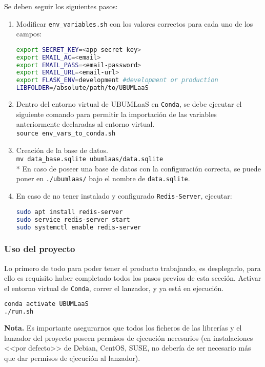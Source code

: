 Se deben seguir los siguientes pasos:
\begin{enumerate}
\item Modificar \texttt{env\_variables.sh} con los valores correctos para cada uno de los campos:
\begin{lstlisting}[language=bash]
export SECRET_KEY=<app secret key>
export EMAIL_AC=<email>
export EMAIL_PASS=<email-password>
export EMAIL_URL=<email-url>
export FLASK_ENV=development #development or production
LIBFOLDER=/absolute/path/to/UBUMLaaS
\end{lstlisting}
\item Dentro del entorno virtual de UBUMLaaS en \texttt{Conda}, se debe ejecutar el siguiente comando para permitir la importación de las variables anteriormente declaradas al entorno virtual.\\
\texttt{source env\_vars\_to\_conda.sh}
\item Creación de la base de datos.\\
\texttt{mv data\_base.sqlite ubumlaas/data.sqlite}\\
* En caso de poseer una base de datos con la configuración correcta, se puede poner en \texttt{./ubumlaas/} bajo el nombre de \texttt{data.sqlite}.
\item En caso de no tener instalado y configurado \texttt{Redis-Server}, ejecutar:
\begin{lstlisting}[language=bash]
sudo apt install redis-server
sudo service redis-server start
sudo systemctl enable redis-server
\end{lstlisting}
\end{enumerate}

\subsubsection{Uso del proyecto}
Lo primero de todo para poder tener el producto trabajando, es desplegarlo, para ello es requisito haber completado todos los pasos previos de esta sección. Activar el entorno virtual de \texttt{Conda}, correr el lanzador, y ya está en ejecución.
\begin{lstlisting}[language=bash]
conda activate UBUMLaaS
./run.sh
\end{lstlisting}
\textbf{Nota.} Es importante asegurarnos que todos los ficheros de las librerías y el lanzador del proyecto poseen permisos de ejecución necesarios (en instalaciones <<por defecto>> de Debian, CentOS, SUSE, no debería de ser necesario más que dar permisos de ejecución al lanzador).

